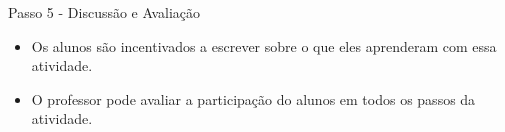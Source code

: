 \documentclass{beamer}
\begin{document}
\begin{frame}{Passo 5 - Discussão e Avaliação}

\begin{itemize}

\item<1-> Os alunos são incentivados a escrever sobre o que eles aprenderam com essa atividade.

\item<2-> O professor pode avaliar a participação do alunos em todos os passos da atividade.

\end{itemize}


\end{frame}














\end{document}
